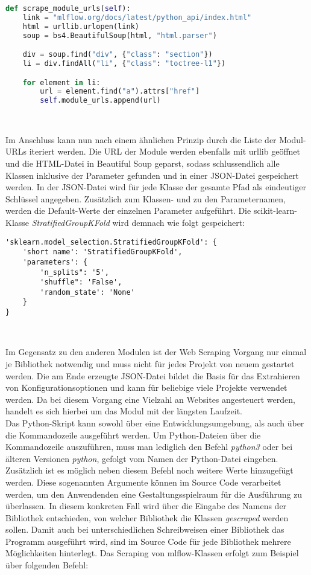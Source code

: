 \documentclass[german,bachelor]{swsLeipzig}
\begin{document}
\begin{lstlisting}[language=Python, frame=single, basicstyle=\small]
def scrape_module_urls(self):
    link = "mlflow.org/docs/latest/python_api/index.html"
    html = urllib.urlopen(link)
    soup = bs4.BeautifulSoup(html, "html.parser")

    div = soup.find("div", {"class": "section"})
    li = div.findAll("li", {"class": "toctree-l1"})

    for element in li:
        url = element.find("a").attrs["href"]
        self.module_urls.append(url)
\end{lstlisting}
\

Im Anschluss kann nun nach einem ähnlichen Prinzip durch die Liste der Modul-URLs iteriert werden.
Die URL der Module werden ebenfalls mit urllib geöffnet und die HTML-Datei in Beautiful Soup geparst, sodass
schlussendlich alle Klassen inklusive der Parameter gefunden und in einer JSON-Datei gespeichert werden.
In der JSON-Datei wird für jede Klasse der gesamte Pfad als eindeutiger Schlüssel angegeben.
Zusätzlich zum Klassen- und zu den Parameternamen, werden die Default-Werte der einzelnen Parameter aufgeführt.
Die scikit-learn-Klasse \textit{StratifiedGroupKFold} wird demnach wie folgt gespeichert:\\

\begin{lstlisting}[frame=single, basicstyle=\small]
'sklearn.model_selection.StratifiedGroupKFold': {
    'short name': 'StratifiedGroupKFold',
    'parameters': {
        'n_splits": '5',
        'shuffle": 'False',
        'random_state': 'None'
    }
}
\end{lstlisting}
\

Im Gegensatz zu den anderen Modulen ist der Web Scraping Vorgang nur einmal je Bibliothek notwendig und muss nicht für jedes Projekt
von neuem gestartet werden.
Die am Ende erzeugte JSON-Datei bildet die Basis für das Extrahieren von Konfigurationsoptionen und kann für beliebige viele
Projekte verwendet werden.
Da bei diesem Vorgang eine Vielzahl an Websites angesteuert werden, handelt es sich hierbei um das Modul mit der längsten Laufzeit.\\

Das Python-Skript kann sowohl über eine Entwicklungsumgebung, als auch über die Kommandozeile ausgeführt werden.
Um Python-Dateien über die Kommandozeile auszuführen, muss man lediglich den Befehl \textit{python3} oder bei älteren
Versionen \textit{python}, gefolgt vom Namen der Python-Datei eingeben.
Zusätzlich ist es möglich neben diesem Befehl noch weitere Werte hinzugefügt werden.
Diese sogenannten Argumente können im Source Code verarbeitet werden, um den Anwendenden eine Gestaltungsspielraum für
die Ausführung zu überlassen.
In diesem konkreten Fall wird über die Eingabe des Namens der Bibliothek entschieden, von welcher Bibliothek die
Klassen  \textit{gescraped} werden sollen.
Damit auch bei unterschiedlichen Schreibweisen einer Bibliothek das Programm ausgeführt wird, sind im Source Code für jede
Bibliothek mehrere Möglichkeiten hinterlegt.
Das Scraping von mlflow-Klassen erfolgt zum Beispiel über folgenden Befehl:\\
\end{document}
